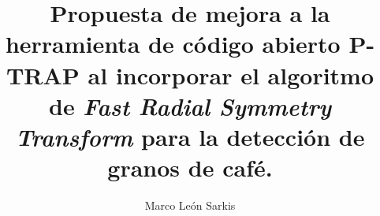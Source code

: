 \title{Propuesta de mejora a la herramienta de c\'odigo abierto P-TRAP al incorporar el algoritmo de \textit{Fast Radial Symmetry Transform} para la detecci\'on de granos de caf\'e.}
\author{Marco Le\'on Sarkis}
\maketitle
\let\cleardoublepage\clearpage
\setcounter{savepage}{\thepage}
\begin{abstractpage}

\end{abstractpage}
